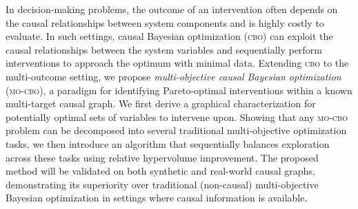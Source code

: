 In decision-making problems, the outcome of an intervention often depends on the causal relationships between system components and is highly costly to evaluate. In such settings, causal Bayesian optimization (\textsc{cbo}) can exploit the causal relationships between the system variables and sequentially perform interventions to approach the optimum with minimal data. Extending \textsc{cbo} to the multi-outcome setting, we propose \textit{multi-objective causal Bayesian optimization} (\textsc{mo-cbo}), a paradigm for identifying Pareto-optimal interventions within a known multi-target causal graph. We first derive a graphical characterization for potentially optimal sets of variables to intervene upon. Showing that any \textsc{mo-cbo} problem can be decomposed into several traditional multi-objective optimization tasks, we then introduce an algorithm that sequentially balances exploration across these tasks using relative hypervolume improvement.  The proposed method will be validated on both synthetic and real-world causal graphs, demonstrating its superiority over traditional (non-causal) multi-objective Bayesian optimization in settings where causal information is available.
